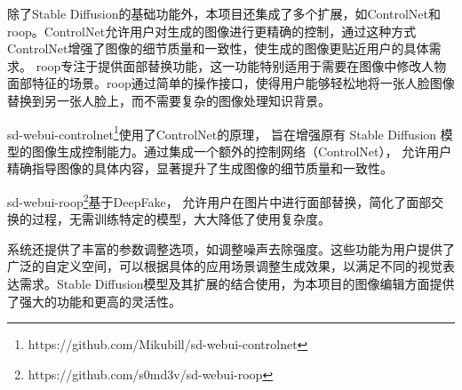 \documentclass[a4paper,AutoFakeBold,oneside,12pt]{book}
\begin{document}
除了Stable Diffusion的基础功能外，本项目还集成了多个扩展，如ControlNet和roop。ControlNet允许用户对生成的图像进行更精确的控制，通过这种方式ControlNet增强了图像的细节质量和一致性，使生成的图像更贴近用户的具体需求。
roop专注于提供面部替换功能，这一功能特别适用于需要在图像中修改人物面部特征的场景。roop通过简单的操作接口，使得用户能够轻松地将一张人脸图像替换到另一张人脸上，而不需要复杂的图像处理知识背景。

sd-webui-controlnet\footnote{https://github.com/Mikubill/sd-webui-controlnet}使用了ControlNet的原理，
旨在增强原有 Stable Diffusion 模型的图像生成控制能力。通过集成一个额外的控制网络（ControlNet），
允许用户精确指导图像的具体内容，显著提升了生成图像的细节质量和一致性。

sd-webui-roop\footnote{https://github.com/s0md3v/sd-webui-roop}基于DeepFake\cite{van2021deepfake}，
允许用户在图片中进行面部替换，简化了面部交换的过程，无需训练特定的模型，大大降低了使用复杂度。

系统还提供了丰富的参数调整选项，如调整噪声去除强度。这些功能为用户提供了广泛的自定义空间，可以根据具体的应用场景调整生成效果，以满足不同的视觉表达需求。Stable Diffusion模型及其扩展的结合使用，为本项目的图像编辑方面提供了强大的功能和更高的灵活性。
\end{document}
